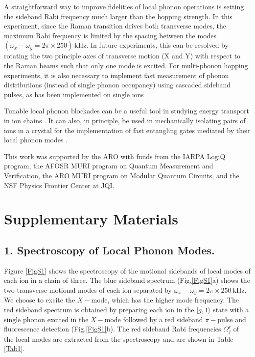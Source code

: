 \documentclass[groupaddress,9pt,twocolumn,superscriptaddress, aps, prl]{revtex4-1}
\newcommand{\ket}[1]{|#1\rangle}
\renewcommand{\thefigure}{\textbf{\arabic{figure}}}
\begin{document}
A straightforward way to improve fidelities of local phonon operations is setting the sideband Rabi frequency much larger than the hopping strength. In this experiment, since the Raman transition drives both transverse modes, the maximum Rabi frequency is limited by the spacing between the modes $(\omega_x-\omega_y = 2\pi\times 250)\:$kHz. In future experiments, this can be resolved by rotating the two principle axes of transverse motion (X and Y) with respect to the Raman beams such that only one mode is excited. For multi-phonon hopping experiments, it is also necessary to implement fast measurement of phonon distributions (instead of single phonon occupancy) using cascaded sideband pulses, as has been implemented on single ions \cite{An2014, Um2016}. 

Tunable local phonon blockades can be a useful tool in studying energy transport in ion chains \cite{Ramm2014}. It can also, in principle, be used in mechanically isolating pairs of ions in a crystal for the implementation of fast entangling gates mediated by their local phonon modes \cite{Zhu2006, Wong-Campos2017}.

This work was supported by the ARO with funds from the IARPA LogiQ program, the AFOSR MURI program on Quantum Measurement and Verification, the ARO MURI program on Modular Quantum Circuits, and the NSF Physics Frontier Center at JQI.



%






\setcounter{figure}{0}
\renewcommand{\thefigure}{S\arabic{figure}}
\setcounter{equation}{0}
\renewcommand{\theequation}{S\arabic{equation}}

\section{Supplementary Materials}

\subsection{1. Spectroscopy of Local Phonon Modes.}

Figure \ref{FigS1} shows the spectroscopy of the motional sidebands of local modes of each ion in a chain of three. The blue sideband spectrum (Fig.\ref{FigS1}a) shows the two transverse motional modes of each ion separated by $\omega_x-\omega_y=2\pi\times250\:$kHz. We choose to excite the $X-$mode, which has the higher mode frequency. The red sideband spectrum is obtained by preparing each ion in the $\ket{g,1}$ state with a single phonon excited in the $X-$mode followed by a red sideband $\pi-$pulse and fluorescence detection (Fig.\ref{FigS1}b). The red sideband Rabi frequencies $\Omega_j^r$ of the local modes are extracted from the spectroscopy and are shown in Table \ref{Tab1}.
\end{document}
